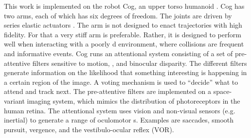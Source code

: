 This work is implemented on the robot Cog, an upper torso humanoid
\cite{brooks99cog}.  
Cog has two arms, each of which has six
degrees of freedom. %
The joints are driven by series elastic
actuators \cite{williamson99robot}.
The arm is not designed to enact trajectories with
high fidelity.  For that a very stiff arm is preferable.  Rather, it
is designed to perform well when interacting with a poorly
\ahhcharacterize{}d environment, where collisions are frequent and
informative events.
Cog runs an attentional system consisting of a set of pre-attentive
filters sensitive to motion, \ahhcolor{}, and binocular disparity. The
different filters generate information on the likelihood that
something interesting is happening in a certain region of the image. A
voting mechanism is used to ``decide'' what to attend and track
next. The pre-attentive filters are implemented on a space-variant
imaging system, which mimics the distribution
of photoreceptors in the human retina.
 The attentional system uses vision and non-visual sensors
(e.g. inertial) to generate a range of oculomotor \ahhbehavior{}s. Examples
are saccades, smooth pursuit, vergence, and the vestibulo-ocular
reflex (VOR).






